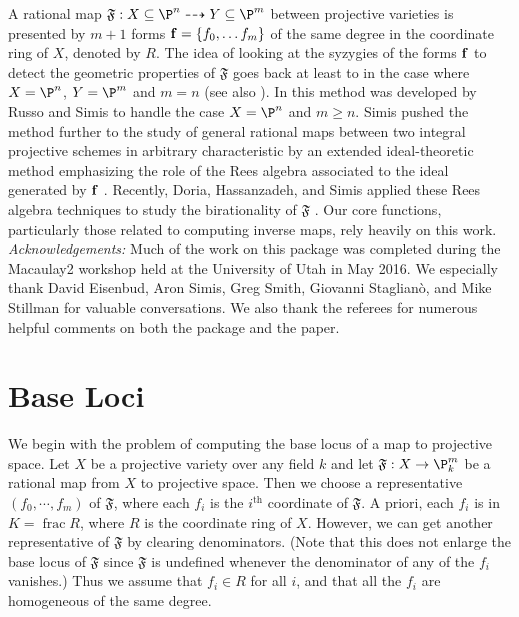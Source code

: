 \documentclass[11pt]{amsart}%
\numberwithin{equation}{theorem}
\def\ff{{\bf f}}
\renewcommand{\:}{\colon}
\DeclareMathOperator{\ffield}{frac} %
\theoremstyle{theorem}
\begin{document}
A rational map $\mathfrak{F}:X\subseteq \P^n\dasharrow Y \subseteq \P^m$ between projective varieties is presented by $m+1$ forms $\ff=\{f_0,\ldots f_m\}$ of the same degree in the coordinate ring of $X$, denoted by  $R$.
The idea of looking at the syzygies of the forms $\ff$ to detect the geometric properties of  $\mathfrak{F}$ goes
back at least to \cite{HulekKatzSchreyer} in the case
where $X=\P^n$, $Y = \P^m$ and $m=n$ (see also \cite{SempleTyrrell}). In \cite{RussoSimisCompositio}  this method was developed by Russo and Simis
to handle the case $X=\P^n$ and $m\geq n$. Simis pushed the method further to the study
of general rational maps between two integral projective schemes in
arbitrary characteristic by an extended ideal-theoretic method
emphasizing the role of the Rees algebra associated to the ideal
generated by $\ff$ \cite{SimisCremona}.  Recently,  Doria, Hassanzadeh, and Simis applied these
 Rees algebra techniques to study the birationality of  $\mathfrak{F}$ \cite{DoriaHassanzadehSimisBirationality}.  Our core functions, particularly those related to computing inverse maps, rely heavily on this work.
\vskip 12pt
\noindent
\emph{Acknowledgements:}  Much of the work  on this package was completed during the Macaulay2 workshop held at the University of Utah in May 2016.  We especially thank David Eisenbud, Aron Simis, Greg Smith, Giovanni Staglian\`o,  and Mike Stillman for valuable conversations.  We also thank the referees for numerous helpful comments on both the package and the paper.

\section{Base Loci}

We begin with the problem of computing the base locus of a map to projective space. Let $X$ be a projective variety over any field $k$ and let $\mathfrak{F}: X \to \P_k^m$ be a rational map from $X$ to projective space. Then we  choose a representative $(f_0, \cdots, f_m)$ of $\mathfrak{F}$, where each $f_i$ is the $i^{\textrm{th}}$ coordinate of $\mathfrak{F}$. A priori, each $f_i$ is in $K = \ffield R$, where $R$ is the coordinate ring of $X$. However, we can get another representative of $\mathfrak{F}$ by clearing denominators. (Note that this does not enlarge the base locus of $\mathfrak{F}$ since $\mathfrak{F}$ is undefined whenever the denominator of any of the $f_i$ vanishes.) Thus we  assume that $f_i\in R$ for all $i$, and that all the $f_i$ are homogeneous of the same degree.
\end{document}
